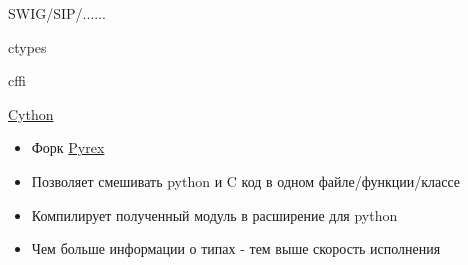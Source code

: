 \documentclass{article}
\begin{document}
\begin{center} SWIG/SIP/...... \end{center}
\newpage

\begin{center} ctypes \end{center}
\newpage

\begin{center} cffi \end{center}
\newpage

\begin{center} \href{http://www.cython.org/}{Cython} \end{center}
\begin{itemize}
    \item Форк \href{http://www.cosc.canterbury.ac.nz/greg.ewing/python/Pyrex/}{Pyrex}
    \item Позволяет смешивать python и C код в одном файле/функции/классе
    \item Компилирует полученный модуль в расширение для python
    \item Чем больше информации о типах - тем выше скорость исполнения
\end{itemize}
\newpage

\end{document}
